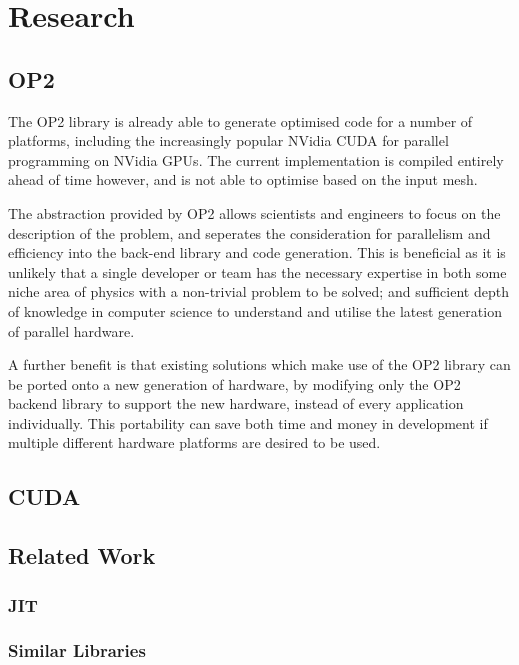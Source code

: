 
\section{Research}

\subsection{OP2}
\par
The OP2 library is already able to generate optimised code for a number of platforms, including the increasingly popular NVidia CUDA for parallel programming on NVidia GPUs. The current implementation is compiled entirely ahead of time however, and is not able to optimise based on the input mesh.
\par
The abstraction provided by OP2 allows scientists and engineers to focus on the description of the problem, and seperates the consideration for parallelism and efficiency into the back-end library and code generation.
This is beneficial as it is unlikely that a single developer or team has the necessary expertise in both some niche area of physics with a non-trivial problem to be solved; and sufficient depth of knowledge in computer science to understand and utilise the latest generation of parallel hardware.
\par
A further benefit is that existing solutions which make use of the OP2 library can be ported onto a new generation of hardware, by modifying only the OP2 backend library to support the new hardware, instead of every application individually. This portability can save both time and money in development if multiple different hardware platforms are desired to be used.


\subsection{CUDA}

\subsection{Related Work}

\subsubsection{JIT}
\label{sec:rw_JIT}

\subsubsection{Similar Libraries}
